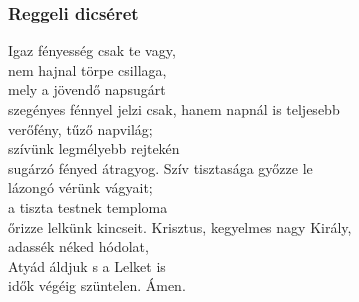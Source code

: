 \documentclass[twoside]{article}
\begin{document}
\subsubsection*{Reggeli dicséret}



\begin{hymnstanzas}
    Igaz fényesség csak te vagy,\\
    nem hajnal törpe csillaga,\\
    mely a jövendő napsugárt\\
    szegényes fénnyel jelzi csak,
\stanzabreak
    hanem napnál is teljesebb\\
    verőfény, tűző napvilág;\\
    szívünk legmélyebb rejtekén\\
    sugárzó fényed átragyog.
\stanzabreak
    Szív tisztasága győzze le\\
    lázongó vérünk vágyait;\\
    a tiszta testnek temploma\\
    őrizze lelkünk kincseit.
\stanzabreak
    Krisztus, kegyelmes nagy Király,\\
    adassék néked hódolat,\\
    Atyád áldjuk s a Lelket is\\
    idők végéig szüntelen. Ámen.
\end{hymnstanzas}



\end{document}
